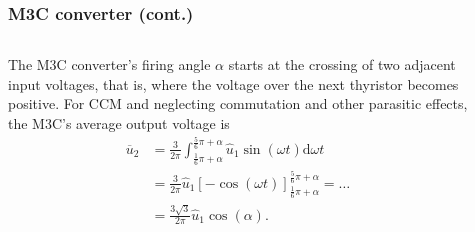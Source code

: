 \begin{frame}
    \frametitle{M3C converter (cont.)}
    \begin{columns}
        \begin{column}{0.5\textwidth}
            The M3C converter's firing angle $\alpha$ starts at the crossing of two adjacent input voltages, that is, where the voltage over the next thyristor becomes positive. For CCM and neglecting commutation and other parasitic effects, the M3C's average output voltage is
            \begin{equation}
                \begin{split}
                    \overline{u}_2 &= \frac{3}{2\pi} \int_{\frac{1}{6}\pi+\alpha}^{\frac{5}{6}\pi+\alpha} \hat{u}_1 \sin(\omega t) \mathrm{d}\omega t\\
                                    &= \frac{3}{2\pi} \hat{u}_1 \left[-\cos(\omega t)\right]_{\frac{1}{6}\pi+\alpha}^{\frac{5}{6}\pi+\alpha}=\ldots\\
                                    &= \frac{3\sqrt{3}}{2\pi}\hat{u}_1\cos(\alpha).
                \end{split}
            \end{equation}
        \end{column}
        \begin{column}{0.5\textwidth}
            \begin{figure}
\end{figure}
\end{column}
\end{columns}
\end{frame}
